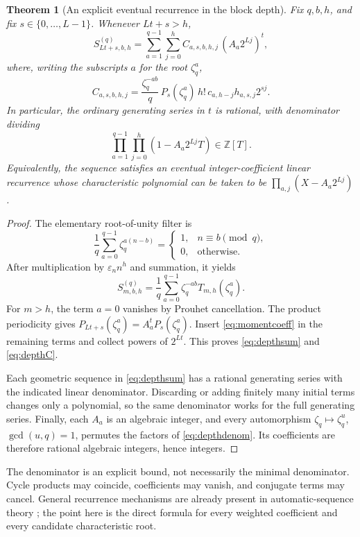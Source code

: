 \documentclass[11pt,letterpaper]{article}
\numberwithin{equation}{section}
\newtheorem{theorem}{Theorem}[section]
\theoremstyle{definition}
\theoremstyle{remark}
\newcommand{\Z}{\mathbb Z}
\newcommand{\eps}{\varepsilon}
\begin{document}
\begin{theorem}[An explicit eventual recurrence in the block depth]
\label{thm:depth}
Fix \(q,b,h\), and fix \(s\in\{0,\ldots,L-1\}\). Whenever \(Lt+s>h\),
\begin{equation}
 S^{(q)}_{Lt+s,b,h}
 =\sum_{a=1}^{q-1}\sum_{j=0}^h
 C_{a,s,b,h,j}\,(A_a2^{Lj})^t,
 \label{eq:depthsum}
\end{equation}
where, writing the subscripts \(a\) for the root \(\zeta_q^a\),
\begin{equation}
 C_{a,s,b,h,j}=
 \frac{\zeta_q^{-ab}}q\,P_s(\zeta_q^a)\,h!\,
 c_{a,h-j}h_{a,s,j}2^{sj}.
 \label{eq:depthC}
\end{equation}
In particular, the ordinary generating series in \(t\) is rational, with denominator dividing
\begin{equation}
 \prod_{a=1}^{q-1}\prod_{j=0}^{h}(1-A_a2^{Lj}T)\in\Z[T].
 \label{eq:depthdenom}
\end{equation}
Equivalently, the sequence satisfies an eventual integer-coefficient linear recurrence whose characteristic polynomial can be taken to be
\(\prod_{a,j}(X-A_a2^{Lj})\).
\end{theorem}
\begin{proof}
The elementary root-of-unity filter is
\[
 \frac1q\sum_{a=0}^{q-1}\zeta_q^{a(n-b)}
 =\begin{cases}1,&n\equiv b\pmod q,\\0,&\text{otherwise}.
 \end{cases}
\]
After multiplication by \(\eps_nn^h\) and summation, it yields
\[
 S^{(q)}_{m,b,h}=\frac1q\sum_{a=0}^{q-1}\zeta_q^{-ab}T_{m,h}(\zeta_q^a).
\]
For \(m>h\), the term \(a=0\) vanishes by Prouhet cancellation. The product periodicity gives
\(P_{Lt+s}(\zeta_q^a)=A_a^tP_s(\zeta_q^a)\).
Insert \eqref{eq:momentcoeff} in the remaining terms and collect powers of \(2^{Lt}\). This proves \eqref{eq:depthsum} and \eqref{eq:depthC}.

Each geometric sequence in \eqref{eq:depthsum} has a rational generating series with the indicated linear denominator. Discarding or adding finitely many initial terms changes only a polynomial, so the same denominator works for the full generating series. Finally, each \(A_a\) is an algebraic integer, and every automorphism \(\zeta_q\mapsto\zeta_q^u\), \(\gcd(u,q)=1\), permutes the factors of \eqref{eq:depthdenom}. Its coefficients are therefore rational algebraic integers, hence integers.
\end{proof}

The denominator is an explicit bound, not necessarily the minimal denominator. Cycle products may coincide, coefficients may vanish, and conjugate terms may cancel. General recurrence mechanisms are already present in automatic-sequence theory \cite{sobolewski}; the point here is the direct formula for every weighted coefficient and every candidate characteristic root.
\end{document}
